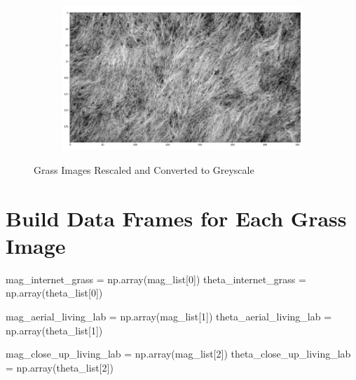 \documentclass[
  letterpaper,
  DIV=11,
  numbers=noendperiod]{scrreprt}
\newenvironment{Shaded}{\begin{snugshade}}{\end{snugshade}}
\newcommand{\DecValTok}[1]{\textcolor[rgb]{0.68,0.00,0.00}{#1}}
\newcommand{\NormalTok}[1]{\textcolor[rgb]{0.00,0.23,0.31}{#1}}
\newcommand{\OperatorTok}[1]{\textcolor[rgb]{0.37,0.37,0.37}{#1}}
\begin{document}
\begin{figure}
\begin{minipage}{0.33\linewidth}
\begin{figure}[H]
\end{figure}%

\end{minipage}%
%
\begin{minipage}{0.33\linewidth}

\begin{figure}[H]

{\centering \includegraphics{images/plots/grass/2.jpg}

}


\end{figure}%

\end{minipage}%

\caption{\label{fig-grass-images}Grass Images Rescaled and Converted to
Greyscale}

\end{figure}%

\section{Build Data Frames for Each Grass
Image}\label{build-data-frames-for-each-grass-image}

\begin{Shaded}
\begin{Highlighting}[]
\NormalTok{mag\_internet\_grass }\OperatorTok{=}\NormalTok{ np.array(mag\_list[}\DecValTok{0}\NormalTok{])}
\NormalTok{theta\_internet\_grass }\OperatorTok{=}\NormalTok{ np.array(theta\_list[}\DecValTok{0}\NormalTok{])}


\NormalTok{mag\_aerial\_living\_lab }\OperatorTok{=}\NormalTok{ np.array(mag\_list[}\DecValTok{1}\NormalTok{])}
\NormalTok{theta\_aerial\_living\_lab }\OperatorTok{=}\NormalTok{ np.array(theta\_list[}\DecValTok{1}\NormalTok{])}


\NormalTok{mag\_close\_up\_living\_lab }\OperatorTok{=}\NormalTok{ np.array(mag\_list[}\DecValTok{2}\NormalTok{])}
\NormalTok{theta\_close\_up\_living\_lab }\OperatorTok{=}\NormalTok{ np.array(theta\_list[}\DecValTok{2}\NormalTok{])}
\end{Highlighting}
\end{Shaded}
\end{document}
